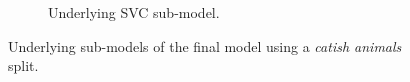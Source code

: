 \begin{figure}[ht]
\begin{subfigure}{.45\textwidth}
        \captionsetup{width=0.8\linewidth}
        \captionsetup{justification=centering}
        \caption{Underlying SVC sub-model.}
    \end{subfigure}
    \captionsetup{width=0.9\linewidth}
    \captionsetup{justification=centering}
    \caption{Underlying sub-models of the final model using a \textit{catish animals} split.}
\end{figure}